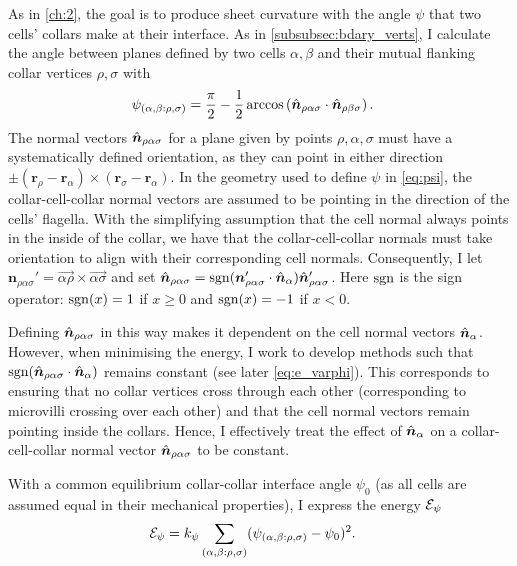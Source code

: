 As in \cref{ch:2}, the goal is to produce sheet curvature with the angle $\psi$ that two cells' collars make at their interface. As in \cref{subsubsec:bdary_verts}, I calculate the angle between planes defined by two cells $\alpha, \beta$ and their mutual flanking collar vertices $\rho, \sigma$ with
\begin{align}
	\psi_{(\alpha, \beta: \rho, \sigma)} &= \frac{\pi}{2} - \frac{1}{2}\arccos \left(\hat{\bm{n}}_{\rho\alpha\sigma} \cdot \hat{\bm{n}}_{\rho\beta\sigma} \right). \label{eq:psi}
\end{align}
\noindent The normal vectors $\hat{\bm{n}}_{\rho\alpha\sigma}$ for a plane given by points $\rho, \alpha, \sigma$ must have a systematically defined orientation, as they can point in either direction $\pm (\bm{r}_\rho - \bm{r}_\alpha) \times (\bm{r}_\sigma - \bm{r}_\alpha)$. 
In the geometry used to define $\psi$ in \cref{eq:psi}, the collar-cell-collar normal vectors are assumed to be pointing in the direction of the cells' flagella. 
With the simplifying assumption that the cell normal always points in the inside of the collar, we have that the collar-cell-collar normals must take orientation to align with their corresponding cell normals. 
Consequently, I let $\bm{n}_{\rho\alpha\sigma}' = \vec{\alpha\rho} \times \vec{\alpha\sigma}$ and set $\hat{\bm{n}}_{\rho\alpha\sigma} = \operatorname{sgn} (\bm{n}_{\rho\alpha\sigma}' \cdot \hat{\bm{n}}_\alpha) \hat{\bm{n}}_{\rho\alpha\sigma}'$.
Here $\operatorname{sgn}$ is the sign operator: $\operatorname{sgn}(x) = 1$ if $x \geq 0$ and $\operatorname{sgn}(x) = -1$ if $x < 0$.

Defining $\hat{\bm{n}}_{\rho\alpha\sigma}$ in this way makes it dependent on the cell normal vectors $\hat{\bm{n}}_\alpha$. 
However, when minimising the energy, I work to develop methods such that $\operatorname{sgn} (\hat{\bm{n}}_{\rho\alpha\sigma} \cdot \hat{\bm{n}}_\alpha)$ remains constant (see later \cref{eq:e_varphi}). 
This corresponds to ensuring that no collar vertices cross through each other (corresponding to microvilli crossing over each other) and that the cell normal vectors remain pointing inside the collars.
Hence, I effectively treat the effect of $\hat{\bm{n}}_\alpha$ on a collar-cell-collar normal vector $\hat{\bm{n}}_{\rho\alpha\sigma}$ to be constant.

With a common equilibrium collar-collar interface angle $\psi_0$ (as all cells are assumed equal in their mechanical properties), I express the energy $\mathcal{E}_\psi$ 
\begin{align}
	\mathcal{E}_\psi &= k_\psi \sum_{(\alpha, \beta: \rho, \sigma)} (\psi_{(\alpha, \beta: \rho, \sigma)} - \psi_0)^2. \label{eq:e_psi}
\end{align}

